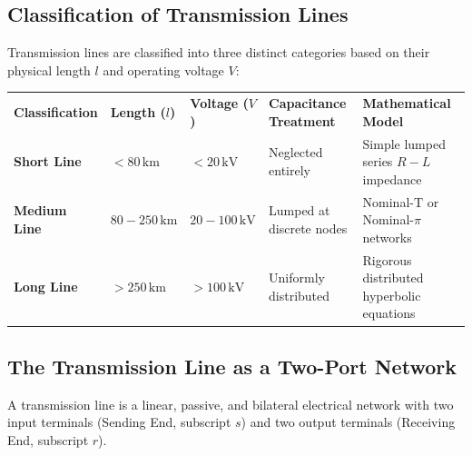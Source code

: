\documentclass[11pt,a4paper]{article}
\begin{document}
\subsection{Classification of Transmission Lines}

Transmission lines are classified into three distinct categories based on their physical length $l$ and operating voltage $V$:

\begin{center}
\small
\begin{tabularx}{\textwidth}{L{2.5cm} C{2.2cm} C{2.2cm} L{3.5cm} X}
  \color{white}\textbf{Classification} & \color{white}\textbf{Length ($l$)} & \color{white}\textbf{Voltage ($V$)} & \color{white}\textbf{Capacitance Treatment} & \color{white}\textbf{Mathematical Model} \\
   \textbf{Short Line} & $< 80\,\text{km}$ & $< 20\,\text{kV}$ & Neglected entirely & Simple lumped series $R-L$ impedance \\
  \textbf{Medium Line} & $80 - 250\,\text{km}$ & $20 - 100\,\text{kV}$ & Lumped at discrete nodes & Nominal-T or Nominal-$\pi$ networks \\
   \textbf{Long Line} & $> 250\,\text{km}$ & $> 100\,\text{kV}$ & Uniformly distributed & Rigorous distributed hyperbolic equations \\
\end{tabularx}
\end{center}

\subsection{The Transmission Line as a Two-Port Network}

A transmission line is a linear, passive, and bilateral electrical network with two input terminals (Sending End, subscript $s$) and two output terminals (Receiving End, subscript $r$).
\end{document}
